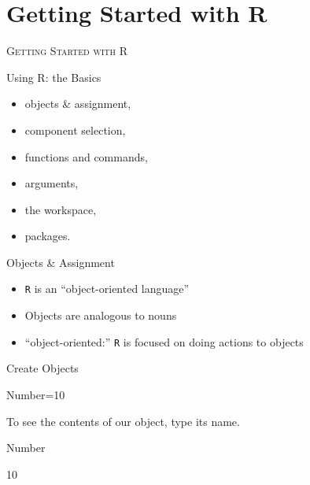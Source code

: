 \documentclass{beamer}\usepackage[]{graphicx}\usepackage[]{color}
\begin{document}
\section{Getting Started with R}

\begin{frame}[noframenumbering]
  \begin{center}
      \textsc{\textrm{Getting Started with R}}
  \end{center}
\end{frame}

\begin{frame}{Using R: the Basics}
  \begin{itemize}
    \item objects \& assignment,
    \item component selection,
    \item functions and commands,
    \item arguments,
    \item the workspace,
    \item packages.
  \end{itemize}
\end{frame}

\begin{frame}{Objects \& Assignment}
  \begin{itemize}
    \item \texttt{R} is an ``object-oriented language''
    \item Objects are analogous to nouns
    \item ``object-oriented:'' \texttt{R} is focused on
      doing actions to objects
  \end{itemize}
\end{frame}

\begin{frame}[fragile]{Create Objects}
\begin{Schunk}
\begin{Sinput}
Number=10
\end{Sinput}
\end{Schunk}
To see the contents of our object, type its name.

\begin{Schunk}
\begin{Sinput}
Number
\end{Sinput}
\begin{Soutput}
[1] 10
\end{Soutput}
\end{Schunk}
\end{frame}
\end{document}
